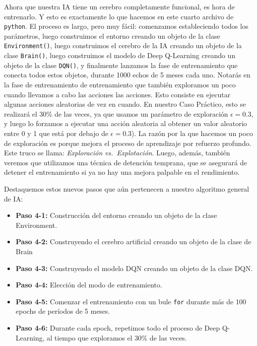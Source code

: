 \documentclass[]{book}
\providecommand{\tightlist}{%
  \setlength{\itemsep}{0pt}\setlength{\parskip}{0pt}}
\begin{document}
Ahora que nuestra IA tiene un cerebro completamente funcional, es hora de entrenarlo. Y esto es exactamente lo que hacemos en este cuarto archivo de \texttt{python}. El proceso es largo, pero muy fácil: comenzamos estableciendo todos los parámetros, luego construimos el entorno creando un objeto de la clase \texttt{Environment()}, luego construimos el cerebro de la IA creando un objeto de la clase \texttt{Brain()}, luego construimos el modelo de Deep Q-Learning creando un objeto de la clase \texttt{DQN()}, y finalmente lanzamos la fase de entrenamiento que conecta todos estos objetos, durante 1000 echos de 5 meses cada uno. Notarás en la fase de entrenamiento de entrenamiento que también exploramos un poco cuando llevamos a cabo las acciones las acciones. Esto consiste en ejecutar algunas acciones aleatorias de vez en cuando. En nuestro Caso Práctico, esto se realizará el 30\% de las veces, ya que usamos un parámetro de exploración \(\epsilon = 0.3\), y luego lo forzamos a ejecutar una acción aleatoria al obtener un valor aleatorio entre 0 y 1 que está por debajo de \(\epsilon = 0.3\)). La razón por la que hacemos un poco de exploración es porque mejora el proceso de aprendizaje por refuerzo profundo. Este truco se llama: \emph{Exploración vs.~Explotación}. Luego, además, también veremos que utilizamos una técnica de detención temprana, que se asegurará de detener el entrenamiento si ya no hay una mejora palpable en el rendimiento.

Destaquemos estos nuevos pasos que aún pertenecen a nuestro algoritmo general de IA:

\begin{itemize}
\tightlist
\item
  \textbf{Paso 4-1:} Construcción del entorno creando un objeto de la clase Environment.
\item
  \textbf{Paso 4-2:} Construyendo el cerebro artificial creando un objeto de la clase de Brain
\item
  \textbf{Paso 4-3:} Construyendo el modelo DQN creando un objeto de la clase DQN.
\item
  \textbf{Paso 4-4:} Elección del modo de entrenamiento.
\item
  \textbf{Paso 4-5:} Comenzar el entrenamiento con un bule \texttt{for} durante más de 100 epochs de períodos de 5 meses.
\item
  \textbf{Paso 4-6:} Durante cada epoch, repetimos todo el proceso de Deep Q-Learning, al tiempo que exploramos el 30\% de las veces.
\end{itemize}
\end{document}
